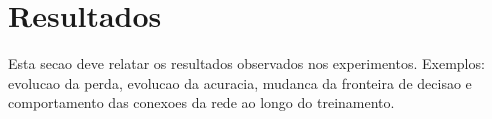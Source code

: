 \section{Resultados}

Esta secao deve relatar os resultados observados nos experimentos. Exemplos:
evolucao da perda, evolucao da acuracia, mudanca da fronteira de decisao e
comportamento das conexoes da rede ao longo do treinamento.

